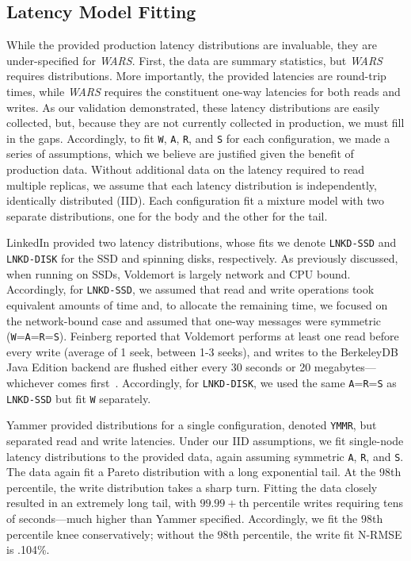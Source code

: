 \documentclass{vldb}
\begin{document}
\subsection{Latency Model Fitting}

While the provided production latency distributions are invaluable,
they are under-specified for \textit{WARS}.  First, the data are
summary statistics, but \textit{WARS} requires distributions.  More
importantly, the provided latencies are round-trip times, while
\textit{WARS} requires the constituent one-way latencies for both
reads and writes.  As our validation demonstrated, these latency
distributions are easily collected, but, because they are not
currently collected in production, we must fill in the
gaps. Accordingly, to fit \texttt{W}, \texttt{A}, \texttt{R}, and
\texttt{S} for each configuration, we made a series of assumptions,
which we believe are justified given the benefit of production data.
Without additional data on the latency required to read multiple
replicas, we assume that each latency distribution is independently,
identically distributed (IID).  Each configuration fit a mixture model
with two separate distributions, one for the body and the other for
the tail.

LinkedIn provided two latency distributions, whose fits we denote
\texttt{LNKD-SSD} and \texttt{LNKD-DISK} for the SSD and spinning
disks, respectively.  As previously discussed, when running on SSDs,
Voldemort is largely network and CPU bound.  Accordingly, for
\texttt{LNKD-SSD}, we assumed that read and write operations took
equivalent amounts of time and, to allocate the remaining time, we
focused on the network-bound case and assumed that one-way messages
were symmetric (\texttt{W}=\texttt{A}=\texttt{R}=\texttt{S}). Feinberg
reported that Voldemort performs at least one read before every write
(average of 1 seek, between 1-3 seeks), and writes to the BerkeleyDB
Java Edition backend are flushed either every 30 seconds or 20
megabytes---whichever comes first~\cite{feinbergpc}.  Accordingly, for
\texttt{LNKD-DISK}, we used the same \texttt{A}=\texttt{R}=\texttt{S}
as \texttt{LNKD-SSD} but fit \texttt{W} separately.

Yammer provided distributions for a single configuration, denoted
\texttt{YMMR}, but separated read and write latencies.  Under our IID
assumptions, we fit single-node latency distributions to the provided
data, again assuming symmetric \texttt{A}, \texttt{R}, and \texttt{S}.
The data again fit a Pareto distribution with a long exponential tail.
At the $98$th percentile, the write distribution takes a sharp turn.
Fitting the data closely resulted in an extremely long tail, with
$99.99+$th percentile writes requiring tens of seconds---much higher
than Yammer specified.  Accordingly, we fit the $98$th percentile knee
conservatively; without the $98$th percentile, the write fit N-RMSE is
.104\%.
\end{document}
